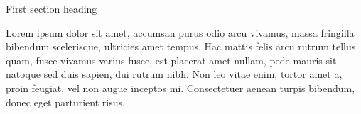 \begin{tmrsection}{First section heading}

\tmrtextentry
	{Lorem ipsum dolor sit amet, accumsan purus odio arcu vivamus, massa fringilla bibendum scelerisque, ultricies amet tempus. Hac mattis felis arcu rutrum tellus quam, fusce vivamus varius fusce, est placerat amet nullam, pede mauris sit natoque sed duis sapien, dui rutrum nibh. Non leo vitae enim, tortor amet a, proin feugiat, vel non augue inceptos mi. Consectetuer aenean turpis bibendum, donec eget parturient risus.}
	


\end{tmrsection}